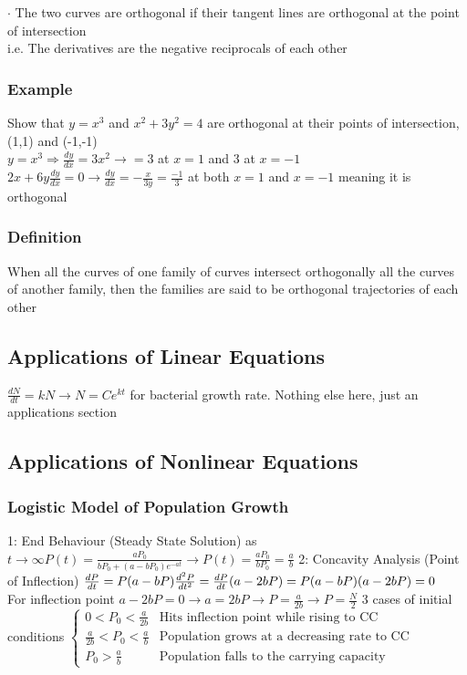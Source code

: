 \documentclass{article}
\begin{document}
\textbf{$\cdot$} The two curves are orthogonal if their tangent lines are orthogonal at the point of intersection
\\i.e. The derivatives are the negative reciprocals of each other
\subsubsection{Example}
Show that $y=x^3$ and $x^2+3y^2=4$ are orthogonal at their points of intersection, (1,1) and (-1,-1)
\\ $y=x^3 \Rightarrow \frac{dy}{dx}=3x^2 \rightarrow =3$ at $x=1$ and 3 at $x=-1$
\\$2x+6y\frac{dy}{dx}=0 \rightarrow \frac{dy}{dx}=-\frac{x}{3y} = \frac{-1}{3}$ at both $x=1$ and $x=-1$ meaning it is orthogonal
\subsubsection{Definition} When all the curves of one family of curves intersect orthogonally all the curves of another family, then the families are said to be orthogonal trajectories of each other
\subsection{Applications of Linear Equations}
$\frac{dN}{dt}=kN\rightarrow N=Ce^{kt}$ for bacterial growth rate. Nothing else here, just an applications section
\subsection{Applications of Nonlinear Equations}
\subsubsection*{Logistic Model of Population Growth}
1: End Behaviour (Steady State Solution)
as $t\rightarrow \infty P(t)=\frac{aP_0}{bP_0+(a-bP_0)e^{-at}} \rightarrow P(t)=\frac{aP_0}{bP_0}=\frac{a}{b}$
2: Concavity Analysis (Point of Inflection)
$\frac{dP}{dt}=P(a-bP)\\\frac{d^2P}{dt^2}=\frac{dP}{dt}(a-2bP)=P(a-bP)(a-2bP)=0$ \\ For inflection point $a-2bP=0\rightarrow a=2bP \rightarrow P=\frac{a}{2b} \rightarrow P=\frac{N}{2}$
3 cases of initial conditions
$\begin{cases}
    0<P_0<\frac{a}{2b} & \text{Hits inflection point while rising to CC}\\
    \frac{a}{2b}<P_0<\frac{a}{b} & \text{Population grows at a decreasing rate to CC}\\
    P_0>\frac{a}{b} & \text{Population falls to the carrying capacity}
\end{cases}$
\end{document}
